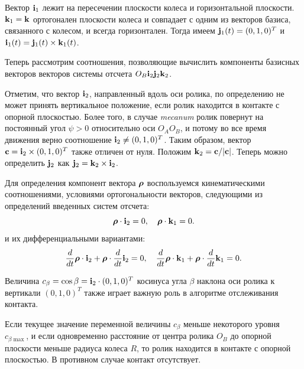 Вектор ${\bf i}_1$ лежит на пересечении плоскости колеса и горизонтальной плоскости.
${\bf k}_1 = {\bf k}$ ортогонален плоскости колеса и совпадает с одним из векторов базиса, связанного с колесом, и всегда горизонтален.
Тогда имеем ${\bf j}_1(t)=(0,1,0)^T$ и ${\bf i}_1(t)={\bf j}_1(t)\times {\bf k}_1(t)$.

Теперь рассмотрим соотношения, позволяющие вычислить компоненты базисных векторов векторов системы отсчета $O_B{\bf i}_2{\bf j}_2{\bf k}_2$.

Отметим, что вектор ${\bf i}_2$, направленный вдоль оси ролика, по определению не может принять вертикальное положение, если ролик находится в контакте с опорной плоскостью.
Более того, в случае \textit{mecanum} ролик повернут на постоянный угол $\psi > 0$ относительно оси $O_AO_B$, и потому во все время движения верно соотношение ${\bf i}_2\ne (0,1,0)^T$.
Таким образом, вектор ${\bf c}={\bf i}_2\times (0,1,0)^T$ также отличен от нуля.
Положим ${\bf k}_2={\bf c}/|{\bf c}|$. Теперь можно определить ${\bf j}_2$ как
${\bf j}_2={\bf k}_2\times {\bf i}_2$.

Для определения компонент вектора $\boldsymbol{\mathbf{\rho}}$ воспользуемся кинематическими соотношениями, условиями ортогональности векторов, следующими из определений введенных систем отсчета:
$$
\boldsymbol{\mathbf{\rho}}\cdot {\bf i}_2=0,\quad\boldsymbol{\mathbf{\rho}}\cdot {\bf k}_1=0.
$$
и их дифференциальными вариантами:
$$
\dfrac{d}{dt}\boldsymbol{\mathbf{\rho}}\cdot {\bf i}_2+\boldsymbol{\mathbf{\rho}}\cdot\dfrac{d}{dt}{\bf i}_2=0,\quad
\dfrac{d}{dt}\boldsymbol{\mathbf{\rho}}\cdot {\bf k}_1+\boldsymbol{\mathbf{\rho}}\cdot\dfrac{d}{dt}{\bf k}_1=0.
$$

Величина $c_{\beta }=\cos\beta ={\bf i}_2\cdot (0,1,0)^T$ косинуса угла $\beta $ наклона оси ролика к вертикали $(0,1,0)^T$ также играет важную роль в алгоритме отслеживания контакта.

Если текущее значение переменной величины $c_{\beta }$ меньше некоторого уровня $c_{\beta\max }$, и если одновременно расстояние от центра ролика $O_B$ до опорной плоскости меньше радиуса колеса $R$, то ролик находится в контакте с опорной плоскостью. В противном случае контакт отсутствует.


